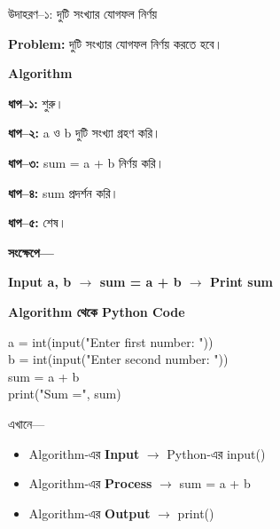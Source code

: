 \begin{examplebox}{উদাহরণ–১: দুটি সংখ্যার যোগফল নির্ণয়}

\textbf{Problem:}
দুটি সংখ্যার যোগফল নির্ণয় করতে হবে।

\medskip

\textbf{\color{darkTeal}Algorithm}

\textbf{ধাপ–১:} শুরু।

\textbf{ধাপ–২:} \textenglish{\ttfamily a} ও
\textenglish{\ttfamily b} দুটি সংখ্যা গ্রহণ করি।

\textbf{ধাপ–৩:}
\textenglish{\ttfamily sum = a + b} নির্ণয় করি।

\textbf{ধাপ–৪:}
\textenglish{\ttfamily sum} প্রদর্শন করি।

\textbf{ধাপ–৫:} শেষ।

\medskip

\textbf{সংক্ষেপে—}

\begin{center}

\textbf{
Input a, b
\(\longrightarrow\)
sum = a + b
\(\longrightarrow\)
Print sum
}

\end{center}

\textbf{\color{darkTeal}Algorithm থেকে Python Code}

\begin{codebox}
\begin{english}
\ttfamily
a = int(input("Enter first number: "))\\
b = int(input("Enter second number: "))\\[0.8mm]
sum = a + b\\[0.8mm]
print("Sum =", sum)
\end{english}
\end{codebox}

এখানে—

\begin{itemize}

\item Algorithm-এর \textbf{Input}
\(\rightarrow\) Python-এর \textenglish{\ttfamily input()}

\item Algorithm-এর \textbf{Process}
\(\rightarrow\) \textenglish{\ttfamily sum = a + b}

\item Algorithm-এর \textbf{Output}
\(\rightarrow\) \textenglish{\ttfamily print()}

\end{itemize}

\end{examplebox}

